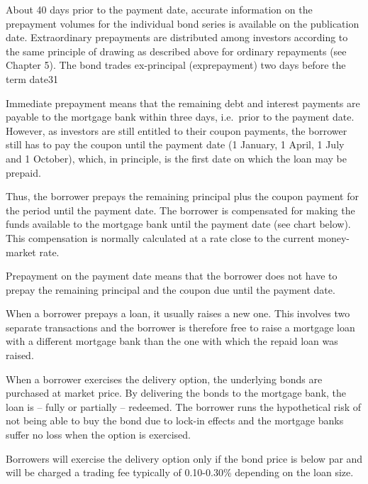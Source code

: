 \documentclass[12pt,twoside]{reedthesis}
\begin{document}
About 40 days prior to the payment date, accurate information on the prepayment volumes for the individual bond series is available on the publication date. Extraordinary prepayments are distributed among investors according to the same principle of drawing as described above for ordinary repayments (see Chapter 5). The bond trades ex-principal (exprepayment) two days before the term date31

Immediate prepayment means that the remaining debt and interest payments are payable to the mortgage bank within three days, i.e.~prior to the payment date. However, as investors are still entitled to their coupon payments, the borrower still has to pay the coupon until the payment date (1 January, 1 April, 1 July and 1 October), which, in principle, is the first date on which the loan may be prepaid.

Thus, the borrower prepays the remaining principal plus the coupon payment for the period until the payment date. The borrower is compensated for making the funds available to the mortgage bank until the payment date (see chart below). This compensation is normally calculated at a rate close to the current money-market rate.

Prepayment on the payment date means that the borrower does not have to prepay the
remaining principal and the coupon due until the payment date.

When a borrower prepays a loan, it usually raises a new one. This involves two separate transactions and the borrower is therefore free to raise a mortgage loan with a different mortgage bank than the one with which the repaid loan was raised.

When a borrower exercises the delivery option, the underlying bonds are purchased at market price. By delivering the bonds to the mortgage bank, the loan is -- fully or partially -- redeemed. The borrower runs the hypothetical risk of not being able to buy the bond due to lock-in effects and the mortgage banks suffer no loss when the option is exercised.

Borrowers will exercise the delivery option only if the bond price is below par and will be charged a trading fee typically of 0.10-0.30\% depending on the loan size.
\end{document}
